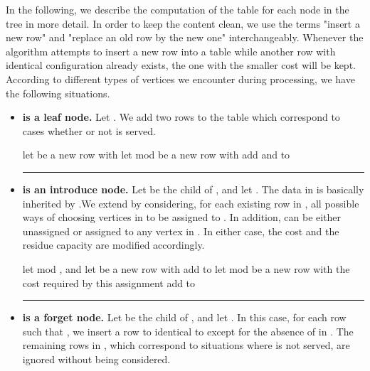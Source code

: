 \documentclass[a4paper,11pt]{article}
\theoremstyle{definition}
\begin{document}
\smallskip

In the following, we describe the computation of the table  for each node  in the tree  in more detail. In order to keep the content clean, we use the terms "insert a new row" and "replace an old row by the new one" interchangeably. Whenever the algorithm attempts to insert a new row into a table while another row with identical configuration already exists, the one with the smaller cost will be kept.  According to different types of vertices we encounter during processing, we have the following situations.

\begin{itemize}
\item{\bf  is a leaf node.} Let . We add two rows to the table  which correspond to cases whether or not  is served.

\smallskip

\begin{algorithmic}[1]
\STATE let  be a new row with 
	\STATE let  mod  be a new row with 
	\STATE add  and  to 
	\newline \rule{\linewidth}{0.2mm}
\end{algorithmic}

\item{\bf  is an introduce node.} Let  be the child of , and let . The data in  is basically inherited by .We extend  by considering, for each existing row  in , all  possible ways of choosing vertices in  to be assigned to . In addition,  can be either unassigned or assigned to any vertex in . In either case, the cost and the residue capacity are modified accordingly. 

\smallskip

\begin{algorithmic}[1]
        \STATE let  mod , and
        \newline let  be a new row with
        \newline 
        \STATE add  to 
        \FORALL{}
            \STATE let  mod  be a new row with
            \newline  the cost required by this assignment
            \STATE add  to 
        \ENDFOR
    \ENDFOR
\ENDFOR
\newline \rule{\linewidth}{0.2mm}
\end{algorithmic}

\item{\bf  is a forget node.} Let  be the child of , and let . In this case, for each row  such that , we insert a row  to  identical to  except for the absence of  in . The remaining rows in , which correspond to situations where  is not served, are ignored without being considered.


\end{itemize}
\end{document}
